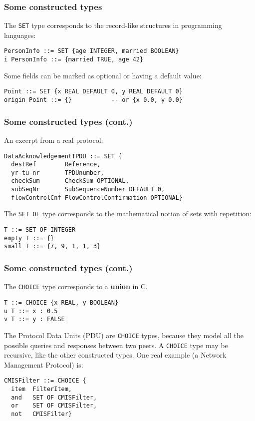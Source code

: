 \documentclass[compress,dvips,xcolor={dvipsnames},t]{beamer}
\begin{document}
\begin{frame}[containsverbatim]
\frametitle{Some constructed types}

The \texttt{SET} type corresponds to the record-like structures in
programming languages:
\begin{verbatim}
PersonInfo ::= SET {age INTEGER, married BOOLEAN}
i PersonInfo ::= {married TRUE, age 42}
\end{verbatim}
Some fields can be marked as optional or having a default value:
\begin{verbatim}
Point ::= SET {x REAL DEFAULT 0, y REAL DEFAULT 0}
origin Point ::= {}           -- or {x 0.0, y 0.0}
\end{verbatim}

\end{frame}

\begin{frame}[containsverbatim]
\frametitle{Some constructed types (cont.)}

An excerpt from a real protocol:
\begin{verbatim}
DataAcknowledgementTPDU ::= SET {
  destRef        Reference,
  yr-tu-nr       TPDUnumber,
  checkSum       CheckSum OPTIONAL,
  subSeqNr       SubSequenceNumber DEFAULT 0,
  flowControlCnf FlowControlConfirmation OPTIONAL}
\end{verbatim}

The \texttt{SET OF} type corresponds to the mathematical notion of
sets with repetition:
\begin{verbatim}
T ::= SET OF INTEGER
empty T ::= {}
small T ::= {7, 9, 1, 1, 3}
\end{verbatim}

\end{frame}

\begin{frame}[containsverbatim]
\frametitle{Some constructed types (cont.)}

The \texttt{CHOICE} type corresponds to a \textbf{union} in C.
\begin{verbatim}
T ::= CHOICE {x REAL, y BOOLEAN}
u T ::= x : 0.5
v T ::= y : FALSE
\end{verbatim}
The Protocol Data Units (PDU) are \texttt{CHOICE} types, because they
model all the possible queries and responses between two peers. A
\texttt{CHOICE} type may be recursive, like the other constructed
types. One real example (a Network Management Protocol) is:
\begin{verbatim}
CMISFilter ::= CHOICE {
  item  FilterItem,
  and   SET OF CMISFilter,
  or    SET OF CMISFilter,
  not   CMISFilter}
\end{verbatim}

\end{frame}
\end{document}
